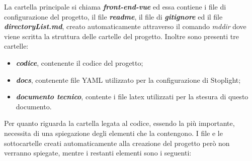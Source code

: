 La cartella principale si chiama \textbf{\textit{front-end-vue}} ed essa contiene i file di configurazione del progetto, il file \textbf{\textit{readme}}, il file di \textbf{\textit{gitignore}} ed il file \textbf{\textit{directoryList.md}}, creato automaticamente attraverso il comando \textit{mddir} dove viene scritta la struttura delle cartelle del progetto. Inoltre sono presenti tre cartelle:
\begin{itemize}
	\item \textbf{\textit{codice}}, contenente il codice del progetto;
	\item \textbf{\textit{docs}}, contenente file YAML utilizzato per la configurazione di Stoplight;
	\item \textbf{\textit{documento tecnico}}, contente i file latex utilizzati per la stesura di questo documento.
\end{itemize} 
Per quanto riguarda la cartella legata al codice, essendo la più importante, necessita di una spiegazione degli elementi che la contengono. I file e le sottocartelle creati automaticamente alla creazione del progetto però non verranno spiegate, mentre i restanti elementi sono i seguenti:
